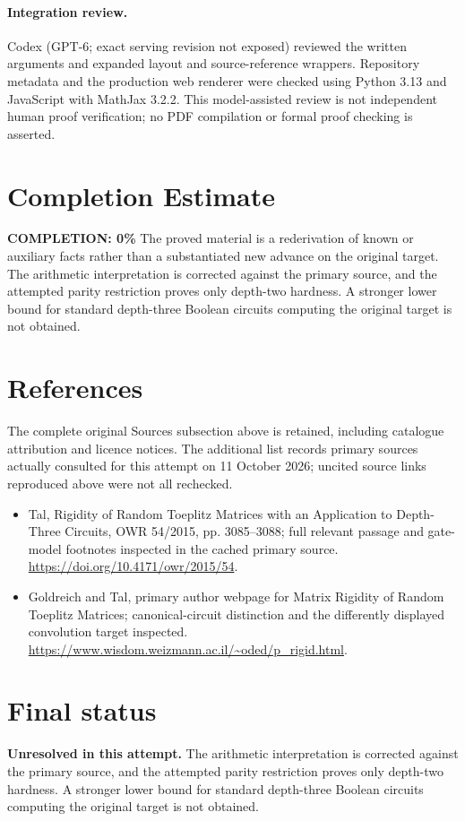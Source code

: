 \documentclass[11pt]{article}
\begin{document}
\paragraph{Integration review.} Codex (GPT-6; exact serving revision not exposed) reviewed the written arguments and expanded layout and source-reference wrappers. Repository metadata and the production web renderer were checked using Python 3.13 and JavaScript with MathJax 3.2.2. This model-assisted review is not independent human proof verification; no PDF compilation or formal proof checking is asserted.

\section{Completion Estimate}
\noindent\textbf{COMPLETION: 0\%}
The proved material is a rederivation of known or auxiliary facts rather than a substantiated new advance on the original target. The arithmetic interpretation is corrected against the primary source, and the attempted parity restriction proves only depth-two hardness. A stronger lower bound for standard depth-three Boolean circuits computing the original target is not obtained.
\section{References}
The complete original Sources subsection above is retained, including catalogue attribution and licence notices. The additional list records primary sources actually consulted for this attempt on 11 October 2026; uncited source links reproduced above were not all rechecked.
\begin{itemize}
\item Tal, Rigidity of Random Toeplitz Matrices with an Application to Depth-Three Circuits, OWR 54/2015, pp. 3085--3088; full relevant passage and gate-model footnotes inspected in the cached primary source. \url{https://doi.org/10.4171/owr/2015/54}.
\item Goldreich and Tal, primary author webpage for Matrix Rigidity of Random Toeplitz Matrices; canonical-circuit distinction and the differently displayed convolution target inspected. \url{https://www.wisdom.weizmann.ac.il/~oded/p_rigid.html}.
\end{itemize}
\section{Final status}
\textbf{Unresolved in this attempt.} The arithmetic interpretation is corrected against the primary source, and the attempted parity restriction proves only depth-two hardness. A stronger lower bound for standard depth-three Boolean circuits computing the original target is not obtained.
\end{document}
